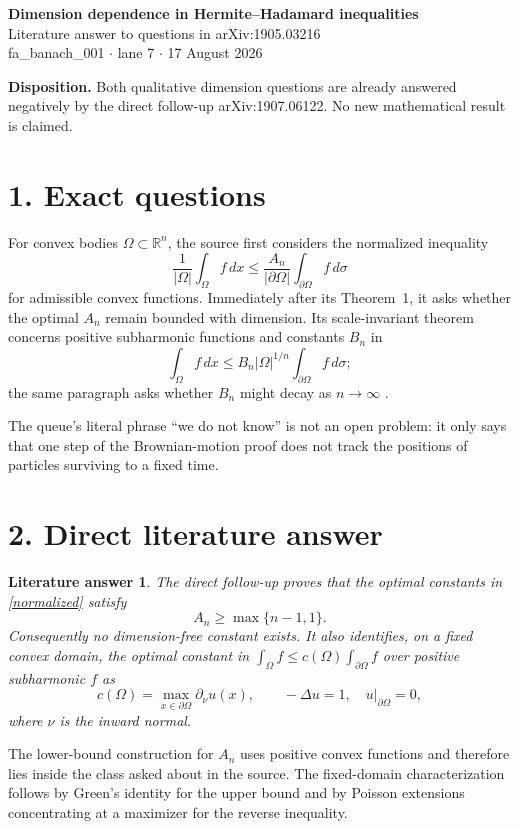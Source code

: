 \documentclass[11pt]{article}
\newtheorem*{theorem}{Literature answer}
\newcommand{\Om}{\Omega}
\begin{document}
\begin{center}
{\Large\bfseries Dimension dependence in Hermite--Hadamard inequalities}\\[4pt]
{\large Literature answer to questions in arXiv:1905.03216}\\[5pt]
{\small fa\_banach\_001 $\cdot$ lane 7 $\cdot$ 17 August 2026}
\end{center}

\vspace{3pt}
\noindent\colorbox{blue!7}{\parbox{0.965\linewidth}{
\textbf{Disposition.} Both qualitative dimension questions are already
answered negatively by the direct follow-up arXiv:1907.06122.  No new
mathematical result is claimed.}}

\section*{1. Exact questions}
For convex bodies $\Om\subset\mathbb R^n$, the source first considers the
normalized inequality
\begin{equation}\label{normalized}
 \frac1{|\Om|}\int_\Om f\,dx
 \leq \frac{A_n}{|\partial\Om|}\int_{\partial\Om}f\,d\sigma
\end{equation}
for admissible convex functions.  Immediately after its Theorem~1, it asks
whether the optimal $A_n$ remain bounded with dimension.  Its scale-invariant
theorem concerns positive subharmonic functions and constants $B_n$ in
\begin{equation}\label{scaled}
 \int_\Om f\,dx
 \leq B_n |\Om|^{1/n}\int_{\partial\Om}f\,d\sigma;
\end{equation}
the same paragraph asks whether $B_n$ might decay as $n\to\infty$ \cite{LS}.

The queue's literal phrase ``we do not know'' is not an open problem: it only
says that one step of the Brownian-motion proof does not track the positions of
particles surviving to a fixed time.

\section*{2. Direct literature answer}
\begin{theorem}
The direct follow-up \cite{BBBHLLSS} proves that the optimal constants in
\eqref{normalized} satisfy
\[
 A_n\geq \max\{n-1,1\}.
\]
Consequently no dimension-free constant exists.  It also identifies, on a
fixed convex domain, the optimal constant in
$\int_\Om f\leq c(\Om)\int_{\partial\Om}f$ over positive subharmonic $f$ as
\[
 c(\Om)=\max_{x\in\partial\Om}\partial_{\nu}u(x),
 \qquad -\Delta u=1,\quad u|_{\partial\Om}=0,
\]
where $\nu$ is the inward normal.
\end{theorem}
The lower-bound construction for $A_n$ uses positive convex functions and
therefore lies inside the class asked about in the source.  The fixed-domain
characterization follows by Green's identity for the upper bound and by
Poisson extensions concentrating at a maximizer for the reverse inequality.
\end{document}
